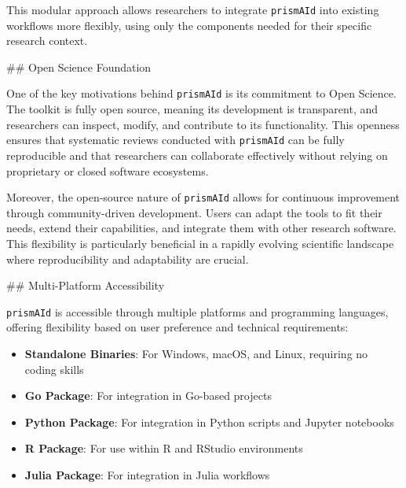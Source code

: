 This modular approach allows researchers to integrate \texttt{prismAId} into existing workflows more flexibly, using only the components needed for their specific research context.

## Open Science Foundation

One of the key motivations behind \texttt{prismAId} is its commitment to Open Science. The toolkit is fully open source, meaning its development is transparent, and researchers can inspect, modify, and contribute to its functionality. This openness ensures that systematic reviews conducted with \texttt{prismAId} can be fully reproducible and that researchers can collaborate effectively without relying on proprietary or closed software ecosystems.

Moreover, the open-source nature of \texttt{prismAId} allows for continuous improvement through community-driven development. Users can adapt the tools to fit their needs, extend their capabilities, and integrate them with other research software. This flexibility is particularly beneficial in a rapidly evolving scientific landscape where reproducibility and adaptability are crucial.

## Multi-Platform Accessibility

\texttt{prismAId} is accessible through multiple platforms and programming languages, offering flexibility based on user preference and technical requirements:

\begin{itemize}
    \item \textbf{Standalone Binaries}: For Windows, macOS, and Linux, requiring no coding skills
    \item \textbf{Go Package}: For integration in Go-based projects
    \item \textbf{Python Package}: For integration in Python scripts and Jupyter notebooks
    \item \textbf{R Package}: For use within R and RStudio environments
    \item \textbf{Julia Package}: For integration in Julia workflows
\end{itemize}

